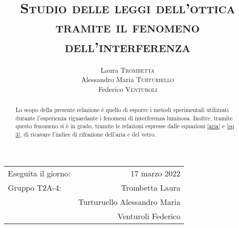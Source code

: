 \documentclass{article}
\title{\textsc{Studio delle leggi dell'ottica tramite il fenomeno dell'interferenza}}
\author{Laura \textsc{Trombetta}\\ Alessandro Maria \textsc{Turturiello}\\Federico \textsc{Venturoli}}
\begin{document}
\maketitle 

\begin{center}
\begin{tabular}{l r}
Eseguita il giorno: &  17 marzo 2022 \\ 
Gruppo T2A-4: & Trombetta Laura\\
& Turturuello Alessandro Maria \\
& Venturoli Federico \\ 

\end{tabular}
\end{center}
\begin{abstract}
    Lo scopo della presente relazione è quello di esporre i metodi sperimentali utilizzati durante l'esperienza riguardante i fenomeni di interferenza luminosa. Inoltre, tramite questo fenomeno si è in grado, tramite le relazioni espresse dalle equazioni \ref{aria} e \ref{eq 3}, di ricavare l'indice di rifrazione dell'aria e del vetro.
\end{abstract}
\tableofcontents
\maketitle
\newpage






%

\end{document}
